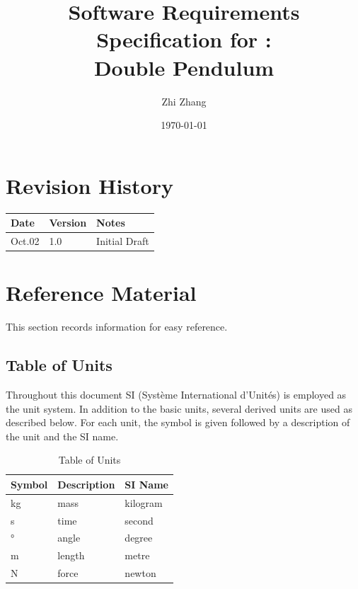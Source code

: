\documentclass[12pt]{article}
\begin{document}
\title{Software Requirements Specification for : \\Double Pendulum} 
\author{Zhi Zhang}
\date{\today}
  
\maketitle

\newpage


\tableofcontents

\newpage

\section*{Revision History}\label{sec_revision}

\begin{tabularx}{\textwidth}{p{3cm}p{2cm}X}
\toprule {\bf Date} & {\bf Version} & {\bf Notes}\\
\midrule
Oct.02 & 1.0 & Initial Draft\\
\bottomrule
\end{tabularx}


\newpage
\section{Reference Material}\label{sec_ref}

This section records information for easy reference.

\subsection{Table of Units}\label{sec_tableofunits}

Throughout this document SI (Syst\`{e}me International d'Unit\'{e}s) is employed
as the unit system. In addition to the basic units, several derived units are
used as described below. For each unit, the symbol is given followed by a
description of the unit and the SI name.
~\newline

\renewcommand{\arraystretch}{1.2}
\begin{table}[H]
\centering
  \noindent \begin{tabular}{l l l} 
    \toprule    
    \textbf{Symbol} & \textbf{Description} & \textbf{SI Name}\\
    \midrule 
    \si{\kilogram} & mass & kilogram\\
    \si{\second} & time & second\\
    \si{\degree} & angle & degree\\
    \si{\metre} & length & metre\\
    \si{\newton} & force & newton\\
    \bottomrule

  \end{tabular}
  \caption{Table of Units}
\end{table}
\end{document}
